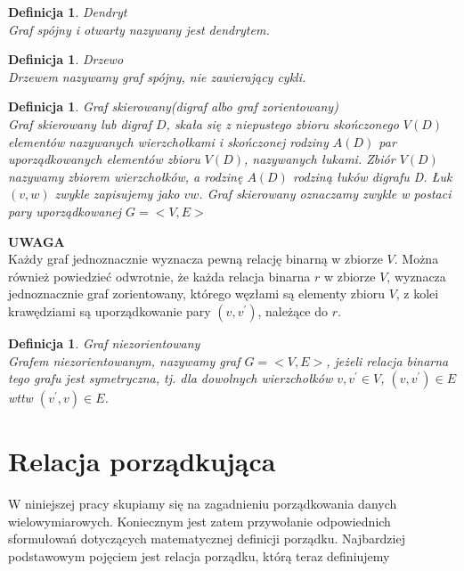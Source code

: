 \documentclass[12pt,a4paper]{report}
\newtheorem{definition}[theorem]{Definicja}
\begin{document}
\begin{definition}{Dendryt \cite[Rozdział 2.3]{panek2013}\\}
Graf spójny i otwarty nazywany jest dendrytem. \\
\end{definition}

\begin{definition}{Drzewo \cite[Rozdział 4]{wilson2008}\\}
Drzewem nazywamy graf spójny, nie zawierający cykli.\\
\end{definition}

\begin{definition}{Graf skierowany(digraf albo graf zorientowany) \cite[Rozdział 7]{wilson2008}\\}
Graf skierowany lub digraf $D$, skała się z niepustego zbioru skończonego $V(D)$ elementów nazywanych wierzchołkami i skończonej rodziny $A(D)$ par uporządkowanych elementów zbioru $V(D)$, nazywanych łukami. Zbiór $V(D)$ nazywamy zbiorem wierzchołków, a rodzinę $A(D)$ rodziną łuków digrafu D. Łuk $(v,w)$ zwykle zapisujemy jako $vw$. Graf skierowany oznaczamy zwykle w postaci pary uporządkowanej $G=<V,E>$\\
\end{definition}

\textbf{UWAGA}\\
Każdy graf jednoznacznie wyznacza pewną relację binarną w zbiorze $V$. Można również powiedzieć odwrotnie, że każda relacja binarna $r$ w zbiorze $V$, wyznacza jednoznacznie graf zorientowany, którego węzłami są elementy zbioru $V$, z kolei krawędziami są uporządkowanie pary $(v,v^{'})$, należące do $r$. 


\begin{definition}{Graf niezorientowany \cite[Rozdział 2.3]{panek2013}\\}
Grafem niezorientowanym, nazywamy graf $G=<V,E>$, jeżeli relacja binarna tego grafu jest symetryczna, tj. dla dowolnych wierzchołków $v,v^{'} \in V$, $(v,v^{'}) \in E$ wttw $(v^{'},v) \in E$.
\end{definition}

\newpage
\section{Relacja porządkująca}
W niniejszej pracy skupiamy się na zagadnieniu porządkowania danych wielowymiarowych. Koniecznym jest zatem przywołanie odpowiednich sformułowań dotyczących matematycznej definicji porządku. Najbardziej podstawowym pojęciem jest relacja porządku, którą teraz definiujemy\\
\end{document}
